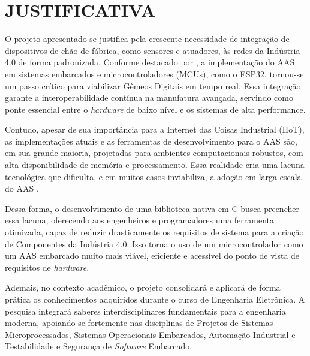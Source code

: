 \chapter{JUSTIFICATIVA}

O projeto apresentado se justifica pela crescente necessidade de integração de dispositivos de chão de fábrica, como sensores e atuadores, às redes da Indústria 4.0 de forma padronizada. Conforme destacado por , a implementação do AAS em sistemas embarcados e microcontroladores (MCUs), como o ESP32, tornou-se um passo crítico para viabilizar Gêmeos Digitais em tempo real. Essa integração garante a interoperabilidade contínua na manufatura avançada, servindo como ponte essencial entre o \textit{hardware} de baixo nível e os sistemas de alta performance. 

Contudo, apesar de sua importância para a Internet das Coisas Industrial (IIoT), as implementações atuais e as ferramentas de desenvolvimento para o AAS são, em sua grande maioria, projetadas para ambientes computacionais robustos, com alta disponibilidade de memória e processamento. Essa realidade cria uma lacuna tecnológica que dificulta, e em muitos casos inviabiliza, a adoção em larga escala do AAS \cite{pribis2021}. 

Dessa forma, o desenvolvimento de uma biblioteca nativa em C busca preencher essa lacuna, oferecendo aos engenheiros e programadores uma ferramenta otimizada, capaz de reduzir drasticamente os requisitos de sistema para a criação de Componentes da Indústria 4.0. Isso torna o uso de um microcontrolador como um AAS embarcado muito mais viável, eficiente e acessível do ponto de vista de requisitos de \textit{hardware}.

Ademais, no contexto acadêmico, o projeto consolidará e aplicará de forma prática os conhecimentos adquiridos durante o curso de Engenharia Eletrônica. A pesquisa integrará saberes interdisciplinares fundamentais para a engenharia moderna, apoiando-se fortemente nas disciplinas de Projetos de Sistemas Microprocessados, Sistemas Operacionais Embarcados, Automação Industrial e Testabilidade e Segurança de \textit{Software} Embarcado.